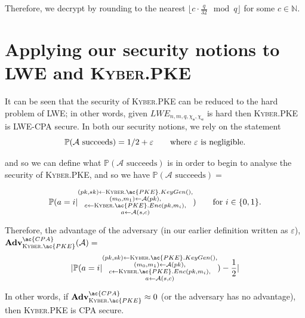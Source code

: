 \documentclass[a4paper, 10pt]{article}
\theoremstyle{definition}
\begin{document}
Therefore, we decrypt by rounding to the nearest $\lfloor c \cdot \frac{q}{32} \mod{q}\rfloor $ for some $c \in \mathbb{N}$.



\section{Applying our security notions to LWE and \textsc{Kyber}.PKE}

It can be seen that the security of \textsc{Kyber}.\ac{PKE} can be reduced to the hard problem of \ac{LWE}; in other words, given $LWE_{n,m,q,\chi _\mathbf{s}, \chi _\mathbf{e}}$ is hard then \textsc{Kyber}.\ac{PKE} is \ac{LWE}-\ac{CPA} secure. In both our security notions, we rely on the statement
\[\mathbb{P} (\mathcal{A} \mbox{ succeeds}) = 1/2 + \varepsilon \mbox{\qquad where $\varepsilon$ is negligible.}\]

and so we can define what $\mathbb{P} (\mathcal{A} \mbox{ succeeds})$ is in order to begin to analyse the security of \textsc{Kyber}.\ac{PKE}, and so we have $\mathbb{P} (\mathcal{A} \mbox{ succeeds})=$

\[\mathbb{P} (a =  i |\substack{ (pk, sk) \leftarrow \textsc{Kyber}.\ac{PKE}.KeyGen(),\\ (m_0, m_1) \leftarrow \mathcal{A}(pk),\\ c \leftarrow \textsc{Kyber}.\ac{PKE}.Enc(pk, m_i),\\ a \leftarrow \mathcal{A}(s, c)}) \qquad \mbox{for $i \in \{0,1\}$.}\]


Therefore, the advantage of the adversary (in our earlier definition written as $\varepsilon$),\\ $\mathbf{Adv}^{\ac{CPA}}_{\textsc{Kyber}.\ac{PKE}}(\mathcal{A}) =$
\[ |\mathbb{P} (a =  i |\substack{(pk, sk) \leftarrow \textsc{Kyber}.\ac{PKE}.KeyGen(),\\ (m_0, m_1) \leftarrow \mathcal{A}(pk),\\ c \leftarrow \textsc{Kyber}.\ac{PKE}.Enc(pk, m_i),\\ a \leftarrow \mathcal{A}(s, c)}) - \frac{1}{2}| \]

In other words, if $\mathbf{Adv}^{\ac{CPA}}_{\textsc{Kyber}.\ac{PKE}} \approx 0$ (or the adversary has no advantage), then \textsc{Kyber}.\ac{PKE} is \ac{CPA} secure.\par
\end{document}
